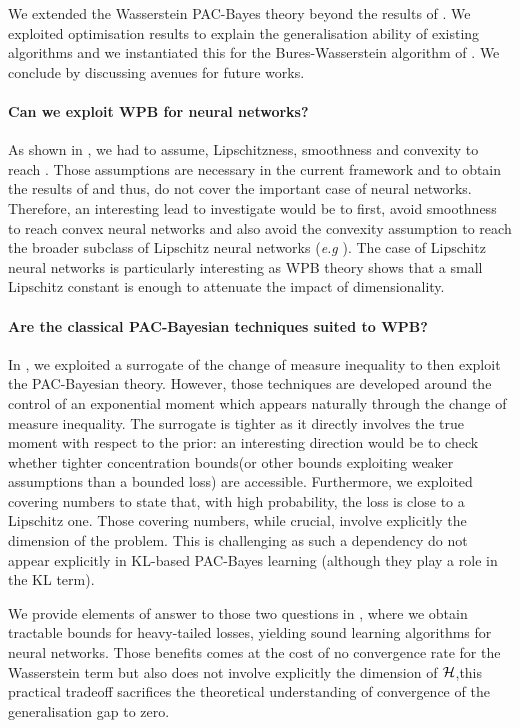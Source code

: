 We extended the Wasserstein PAC-Bayes theory beyond the results of \citet{amit2022integral}. We exploited optimisation results to explain the generalisation ability of existing algorithms and we instantiated this for the Bures-Wasserstein algorithm of \citet{lambert2022variational}. We conclude by discussing avenues for future works.

\paragraph{Can we exploit WPB for neural networks?} As shown in , we had to assume, Lipschitzness, smoothness and convexity to reach . Those assumptions are necessary in the current framework and to obtain the results of \citet{lambert2022variational} and thus, do not cover the important case of neural networks.
Therefore, an interesting lead to investigate would be to first, avoid smoothness to reach convex neural networks \citet{bengio2005convex} and also avoid the convexity assumption to reach the broader subclass of Lipschitz neural networks (\emph{e.g} \citealp{gouk2021regularisation}).
The case of Lipschitz neural networks is particularly interesting as WPB theory shows that a small Lipschitz constant is enough to attenuate the impact of dimensionality. 

\paragraph{Are the classical PAC-Bayesian techniques suited to WPB?} In , we exploited a surrogate of the change of measure inequality to then exploit the PAC-Bayesian theory. However, those techniques are developed around the control of an exponential moment which appears naturally through the change of measure inequality. The surrogate is tighter as it directly involves the true moment with respect to the prior: an interesting direction would be to check whether tighter concentration bounds(or other bounds exploiting weaker assumptions than a bounded loss) are accessible. Furthermore, we exploited covering numbers to state that, with high probability, the loss is close to a Lipschitz one. Those covering numbers, while crucial, involve explicitly the dimension of the problem. This is challenging as such a dependency do not appear explicitly in KL-based PAC-Bayes learning (although they play a role in the KL term). 

We provide elements of answer to those two questions in , where we obtain tractable bounds for heavy-tailed losses, yielding sound learning algorithms for neural networks. Those benefits comes at the cost of no convergence rate for the Wasserstein term but also does not involve explicitly the dimension of $\mathcal{H}$,this practical tradeoff sacrifices the theoretical understanding of convergence of the generalisation gap to zero.


